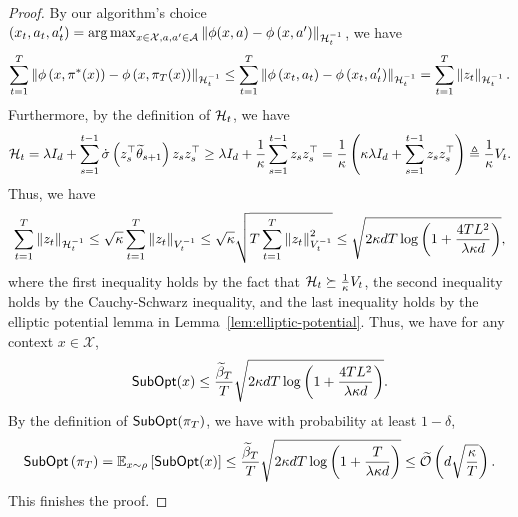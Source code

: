 \begin{proof}
   By our algorithm's choice $(x_t, a_t, a_t^{\prime}) = \operatorname*{arg\,max}_{x \in \mathcal{X}, a, a^{\prime} \in \mathcal{A}}\left\|\phi(x, a)-\phi\left(x, a^{\prime}\right)\right\|_{\mathcal{H}_t^{-1}}$, we have
   \begin{align*}
    \sum_{t=1}^T\left\|\phi\left(x, \pi^*(x)\right)-\phi\left(x, \pi_T(x)\right)\right\|_{\mathcal{H}_t^{-1}} \leq \sum_{t=1}^T\left\|\phi\left(x_t, a_t\right)-\phi\left(x_t, a_t^{\prime}\right)\right\|_{\mathcal{H}_t^{-1}} = \sum_{t=1}^T\left\|z_t\right\|_{\mathcal{H}_t^{-1}}.
   \end{align*}
   Furthermore, by the definition of $\mathcal{H}_t$, we have
   \begin{align*}
    \mathcal{H}_t = \lambda I_d + \sum_{s=1}^{t-1} \dot{\sigma}\left(z_s^{\top} \widetilde{\theta}_{s+1}\right) z_s z_s^{\top} \geq \lambda I_d + \frac{1}{\kappa} \sum_{s=1}^{t-1} z_s z_s^{\top} = \frac{1}{\kappa}\left(\kappa \lambda I_d + \sum_{s=1}^{t-1} z_s z_s^{\top}\right) \triangleq \frac{1}{\kappa} V_t.
    \end{align*}
    Thus, we have
    \begin{align*}
      \sum_{t=1}^T\left\|z_t\right\|_{\mathcal{H}_t^{-1}} \leq \sqrt{\kappa} \sum_{t=1}^T\left\|z_t\right\|_{V_t^{-1}} \leq \sqrt{\kappa} \sqrt{T \sum_{t=1}^T\left\|z_t\right\|^2_{V_t^{-1}}} \leq \sqrt{2 \kappa d T \log \left(1+\frac{4TL^2}{\lambda \kappa d}\right)},
    \end{align*}
    where the first inequality holds by the fact that $\mathcal{H}_t \succeq \frac{1}{\kappa} V_t$, the second inequality holds by the Cauchy-Schwarz inequality, and the last inequality holds by the elliptic potential lemma in Lemma~\ref{lem:elliptic-potential}. Thus, we have for any context $x \in \mathcal{X}$,
    \begin{align*}
        \operatorname*{\mathsf{SubOpt}}(x) \leq \frac{\widetilde{\beta}_T}{T} \sqrt{2 \kappa d T \log \left(1+\frac{4TL^2}{\lambda \kappa d}\right)}.
    \end{align*}
    By the definition of $\operatorname*{\mathsf{SubOpt}}(\pi_T)$, we have with probability at least $1-\delta$,
    \begin{align*}
        \operatorname*{\mathsf{SubOpt}}\left(\pi_T\right) = \mathbb{E}_{x \sim \rho} \left[\operatorname*{\mathsf{SubOpt}}(x)\right] \leq \frac{\widetilde{\beta}_T}{T} \sqrt{2 \kappa d T \log \left(1+\frac{T}{\lambda \kappa d}\right)} \leq \widetilde{\mathcal{O}}\left(d \sqrt{\frac{\kappa}{T}}\right).
    \end{align*}
    This finishes the proof.
\end{proof} 


